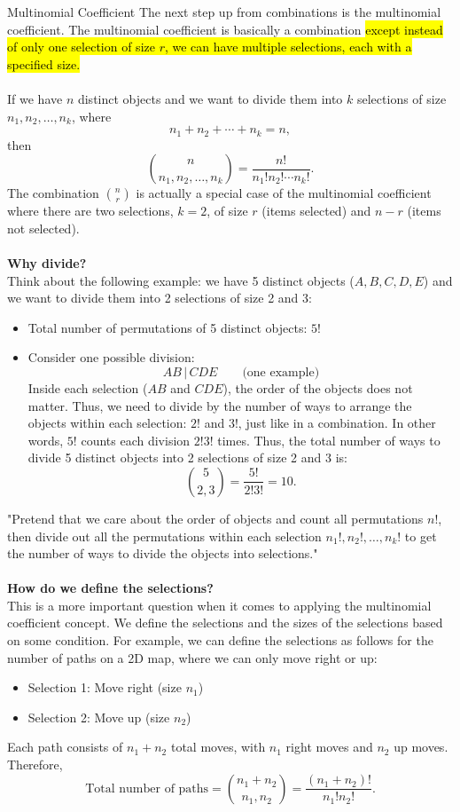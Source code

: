 ﻿\documentclass[12pt]{article}
\begin{document}
\begin{definition}{Multinomial Coefficient}
   The next step up from combinations is the multinomial coefficient. The multinomial coefficient is basically a combination \hl{except instead of only one selection of size $r$, we can have multiple selections, each with a specified size.}\\\\
If we have $n$ distinct objects and we want to divide them into $k$ selections of size $n_1, n_2, \ldots, n_k$, where
\[
n_1+n_2+\cdots+n_k=n,
\]
then
\[
\binom{n}{n_1,n_2,\ldots,n_k}
=
\frac{n!}{n_1!n_2!\cdots n_k!}.
\]
The combination $\binom{n}{r}$ is actually a special case of the multinomial coefficient where there are two selections, $k=2$, of size $r$ (items selected) and $n-r$ (items not selected).\\\\
\textbf{Why divide?}\\
Think about the following example: we have 5 distinct objects ($A, B, C, D, E$) and we want to divide them into 2 selections of size 2 and 3:
\begin{itemize}
    \item Total number of permutations of 5 distinct objects: $5!$
    \item Consider one possible division:
    \[
    AB\,|\,CDE
    \qquad \text{(one example)}
    \]
    Inside each selection ($AB$ and $CDE$), the order of the objects does not matter. Thus, we need to divide by the number of ways to arrange the objects within each selection: $2!$ and $3!$, just like in a combination. In other words, $5!$ counts each division $2!3!$ times. Thus, the total number of ways to divide 5 distinct objects into 2 selections of size 2 and 3 is:
    \[
    \binom{5}{2,3}
    =
    \frac{5!}{2!3!}
    =
    10.
    \]
\end{itemize}
"Pretend that we care about the order of objects and count all permutations $n!$, then divide out all the permutations within each selection $n_1!, n_2!, \ldots, n_k!$ to get the number of ways to divide the objects into selections."\\\\
\textbf{How do we define the selections?}\\
This is a more important question when it comes to applying the multinomial coefficient concept. We define the selections and the sizes of the selections based on some condition. For example, we can define the selections as follows for the number of paths on a 2D map, where we can only move right or up:
\begin{itemize}
    \item Selection 1: Move right (size $n_1$)
    \item Selection 2: Move up (size $n_2$)
\end{itemize}

Each path consists of $n_1+n_2$ total moves, with $n_1$ right moves and $n_2$ up moves. Therefore,
\[
\text{Total number of paths}
=
\binom{n_1+n_2}{n_1,n_2}
=
\frac{(n_1+n_2)!}{n_1!n_2!}.
\]
\end{definition}
\end{document}

